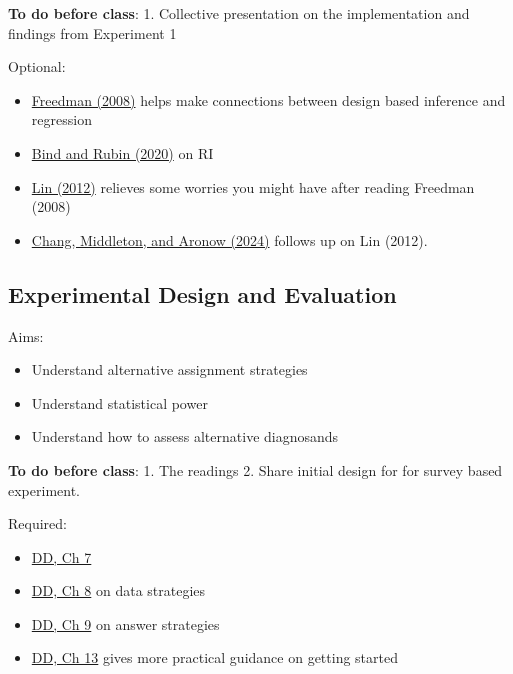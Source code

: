\documentclass[
  10pt,
  a4paper,10pt]{extarticle}
\providecommand{\tightlist}{%
  \setlength{\itemsep}{0pt}\setlength{\parskip}{0pt}}
\begin{document}
\textbf{To do before class}: 1. Collective presentation on the
implementation and findings from Experiment 1

Optional:

\begin{itemize}
\tightlist
\item
  \href{https://www.stat.berkeley.edu/~census/neyregr.pdf}{Freedman
  (2008)} helps make connections between design based inference and
  regression
\item
  \href{https://scholar.harvard.edu/files/marie-abele/files/pnas.pdf}{Bind
  and Rubin (2020)} on RI
\item
  \href{https://arxiv.org/pdf/1208.2301.pdf}{Lin (2012)} relieves some
  worries you might have after reading Freedman (2008)
\item
  \href{https://onlinelibrary.wiley.com/doi/full/10.3982/ECTA20289}{Chang,
  Middleton, and Aronow (2024)} follows up on Lin (2012).
\end{itemize}

\subsection{Experimental Design and
Evaluation}\label{experimental-design-and-evaluation}

Aims:

\begin{itemize}
\tightlist
\item
  Understand alternative assignment strategies
\item
  Understand statistical power
\item
  Understand how to assess alternative diagnosands
\end{itemize}

\textbf{To do before class}: 1. The readings 2. Share initial design for
for survey based experiment.

Required:

\begin{itemize}
\tightlist
\item
  \href{https://book.declaredesign.org/declaration-diagnosis-redesign/diagnosing-designs.html}{DD,
  Ch 7}
\item
  \href{https://book.declaredesign.org/declaration-diagnosis-redesign/crafting-data-strategy.html}{DD,
  Ch 8} on data strategies
\item
  \href{https://book.declaredesign.org/declaration-diagnosis-redesign/choosing-answer-strategy.html}{DD,
  Ch 9} on answer strategies
\item
  \href{https://book.declaredesign.org/declaration-diagnosis-redesign/declaration-in-code.html}{DD,
  Ch 13} gives more practical guidance on getting started
\end{itemize}
\end{document}
